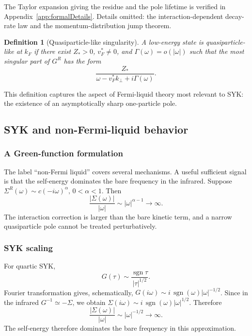 \documentclass[11pt]{article}
\numberwithin{equation}{section}
\theoremstyle{exposition}
\newtheorem{definition}{Definition}[section]
\theoremstyle{result}
\newcommand{\sgn}{\operatorname{sgn}}
\begin{document}
The Taylor expansion giving the residue and the pole lifetime is verified in Appendix~\ref{app:formalDetails}. Details omitted: the interaction-dependent decay-rate law and the momentum-distribution jump theorem.

\begin{definition}[Quasiparticle-like singularity]
A low-energy state is quasiparticle-like at $k_F$ if there exist $Z_*>0$, $v_F^*\ne0$, and $\Gamma(\omega)=o(|\omega|)$ such that the most singular part of $G^R$ has the form
\begin{equation*}
\frac{Z_*}{\omega-v_F^*k_\perp+i\Gamma(\omega)}.
\end{equation*}
\end{definition}

This definition captures the aspect of Fermi-liquid theory most relevant to SYK: the existence of an asymptotically sharp one-particle pole.

\subsection{SYK and non-Fermi-liquid behavior}

\subsubsection{A Green-function formulation}

The label ``non-Fermi liquid'' covers several mechanisms. A useful sufficient signal is that the self-energy dominates the bare frequency in the infrared. Suppose $\Sigma^R(\omega)\sim c(-i\omega)^\alpha, \, 0<\alpha<1$. Then
\begin{equation*}
\frac{|\Sigma(\omega)|}{|\omega|}
\sim |\omega|^{\alpha-1}\to\infty.
\end{equation*}
The interaction correction is larger than the bare kinetic term, and a narrow quasiparticle pole cannot be treated perturbatively.

\subsubsection{SYK scaling}

For quartic SYK,
\begin{equation*}
G(\tau)\sim \frac{\sgn\tau}{|\tau|^{1/2}}.
\end{equation*}
Fourier transformation gives, schematically, $G(i\omega) \sim i\,\sgn(\omega)|\omega|^{-1/2}$. Since in the infrared $G^{-1}\simeq-\Sigma$, we obtain $\Sigma(i\omega) \sim i\,\sgn(\omega)|\omega|^{1/2}$. Therefore
\begin{equation*}
\frac{|\Sigma(\omega)|}{|\omega|}
\sim |\omega|^{-1/2}\to\infty.
\end{equation*}
The self-energy therefore dominates the bare frequency in this approximation.
\end{document}

